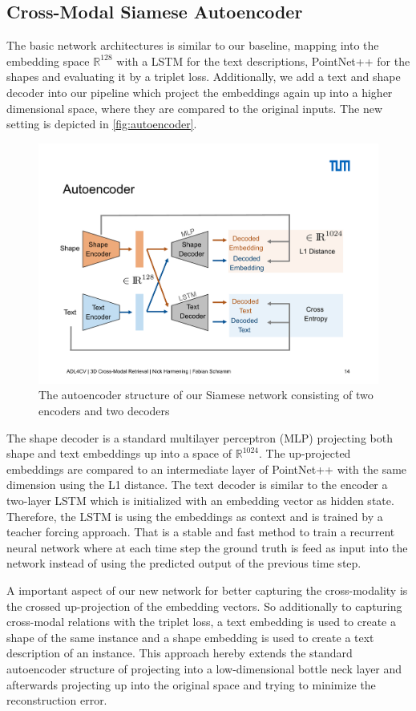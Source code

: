 \documentclass[10pt,twocolumn,letterpaper]{article}
\begin{document}
\subsection{Cross-Modal Siamese Autoencoder}
The basic network architectures is similar to our baseline, mapping into the embedding space $\mathbb{R}^{128}$ with a LSTM for the text descriptions, PointNet++ for the shapes and evaluating it by a triplet loss. Additionally, we add a text and shape decoder into our pipeline which project the embeddings again up into a higher dimensional space, where they are compared to the original inputs. The new setting is depicted in \autoref{fig:autoencoder}.
\begin{figure}[t]%
	\centering
	\includegraphics[width=0.8\linewidth]{fig4.pdf}
	\caption[]{The autoencoder structure of our Siamese network consisting of two encoders and two decoders}
	\label{fig:autoencoder}
\end{figure}
The shape decoder is a standard multilayer perceptron (MLP) projecting both shape and text embeddings up into a space of $\mathbb{R}^{1024}$. The up-projected embeddings are compared to an intermediate layer of PointNet++ with the same dimension using the L1 distance. The text decoder is similar to the encoder a two-layer LSTM which is initialized with an embedding vector as hidden state. Therefore, the LSTM is using the embeddings as context and is trained by a teacher forcing approach. That is a stable and fast method to train a recurrent neural network where at each time step the ground truth is feed as input into the network instead of using the predicted output of the previous time step.

A important aspect of our new network for better capturing the cross-modality is the crossed up-projection of the embedding vectors. So additionally to capturing cross-modal relations with the triplet loss, a text embedding is used to create a shape of the same instance and a shape embedding is used to create a text description of an instance. This approach hereby extends the standard autoencoder structure of projecting into a low-dimensional bottle neck layer and afterwards projecting up into the original space and trying to minimize the reconstruction error.
\end{document}
